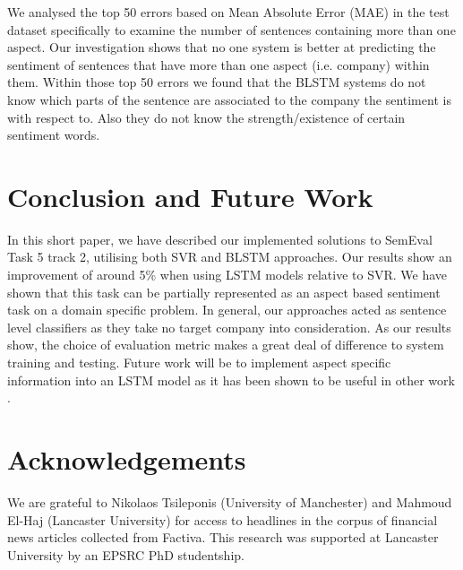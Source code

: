 \documentclass[11pt,a4paper]{article}
\begin{document}
We analysed the top 50 errors based on Mean Absolute Error (MAE) in the test dataset specifically to examine the number of sentences containing more than one aspect. Our investigation shows that no one system is better at predicting the sentiment of sentences that have more than one aspect (i.e. company) within them. Within those top 50 errors we found that the BLSTM systems do not know which parts of the sentence are associated to the company the sentiment is with respect to. Also they do not know the strength/existence of certain sentiment words.

\section{Conclusion and Future Work}
\label{sec:conclusion}
In this short paper, we have described our implemented solutions to SemEval Task 5 track 2, utilising both SVR and BLSTM approaches. Our results show an improvement of around 5\% when using LSTM models relative to SVR. 
We have shown that this task can be partially represented as an aspect based sentiment task on a domain specific problem. In general, our approaches acted as sentence level classifiers as they take no target company into consideration. As our results show, the choice of evaluation metric makes a great deal of difference to system training and testing. Future work will be to implement aspect specific information into an LSTM model as it has been shown to be useful in other work \cite{wangattention}.

\section*{Acknowledgements}
We are grateful to Nikolaos Tsileponis (University of Manchester) and Mahmoud El-Haj (Lancaster University) for access to headlines in the corpus of financial news articles collected from Factiva. This research was supported at Lancaster University by an EPSRC PhD studentship.




\appendix
\end{document}
